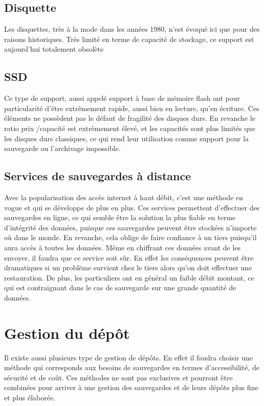 \documentclass[a4paper,11pt]{report}
\begin{document}
\subsection{Disquette}
Les disquettes, très à la mode dans les années 1980, n'est évoqué ici que pour des raisons historiques.
Très limité en terme de capacité de stockage, ce support est aujourd'hui totalement obsolète

\subsection{SSD}
Ce type de support, aussi appelé support à base de mémoire flash ont pour particularité d'être extrêmement rapide, aussi bien en lecture, qu'en écriture.
Ces éléments ne possèdent pas le défaut de fragilité des disques durs.
En revanche le ratio prix \slash capacité est extrèmement élevé, et les capacités sont plus limités que les disques durs classiques, ce qui rend leur utilisation comme support pour la sauvegarde ou l'archivage impossible.

\subsection{Services de sauvegardes à distance}
Avec la popularisation des accès internet à haut débit, c'est une méthode en vogue et qui se développe de plus en plus.
Ces services permettent d'effectuer des sauvegardes en ligne, ce qui semble être la solution la plus fiable en terme d'intégrité des données, puisque ces sauvegardes peuvent être stockées n'importe où dans le monde.
En revanche, cela oblige de faire confiance à un tiers puisqu'il aura accès à toutes les données. Même en chiffrant ces données avant de les envoyer, il faudra que ce service soit sûr. En effet les conséquences peuvent être dramatiques si un problème survient chez le tiers alors qu'on doit effectuer une restauration.
De plus, les particuliers ont en général un faible débit montant, ce qui est contraignant dans le cas de sauvegarde sur une grande quantité de données.


\section{Gestion du dépôt}
Il existe aussi plusieurs type de gestion de dépôts. 
En effet il faudra choisir une méthode qui corresponds aux besoins de sauvegardes en termes d'accessibilité, de sécurité et de coût.
Ces méthodes ne sont pas exclusives et pourront être combinées pour arriver à une gestion des sauvegardes et de leurs dépôts plus fine et plus élaborée.
\end{document}
